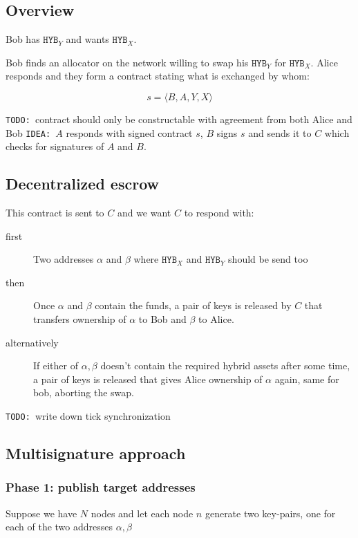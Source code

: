 \documentclass[a4paper]{article}
\newcommand{\hyb}[1]{\ensuremath{\mathtt{ HYB }_{#1}}}
\newcommand{\TODO}{{\color{red}\texttt{TODO: }}}
\newcommand{\IDEA}{{\color{blue}\texttt{IDEA: }}}
\begin{document}
\subsection{Overview}

Bob has \hyb{Y} and wants \hyb{X}.

Bob finds an allocator on the network willing to swap his \hyb{Y} for \hyb{X}.
Alice responds and they form a contract stating what is exchanged by whom:

\[
s = \langle B, A, Y, X \rangle
\]

\TODO contract should only be constructable with agreement from both Alice and Bob
\IDEA $A$ responds with signed contract $s$, $B$ signs $s$ and sends it to $C$ which
checks for signatures of $A$ and $B$.

\subsection{Decentralized escrow}

This contract is sent to $C$ and we want $C$ to respond with:

\begin{description}
\item[first] Two addresses $\alpha$ and $\beta$ where \hyb{X} and \hyb{Y} should be send too
\item[then] Once $\alpha$ and $\beta$ contain the funds, a pair of keys is released by $C$ that transfers ownership of $\alpha$ to Bob and $\beta$ to Alice.
\item[alternatively] If either of $\alpha,\beta$ doesn't contain the required hybrid assets after some time, a pair of keys is released that gives Alice ownership of $\alpha$ again, same for bob, aborting the swap.
\end{description}

\TODO write down tick synchronization

\subsection{Multisignature approach}

\subsubsection{Phase 1: publish target addresses}

Suppose we have $N$ nodes and let each node $n$ generate two key-pairs,
one for each of the two addresses $\alpha, \beta$
\end{document}
